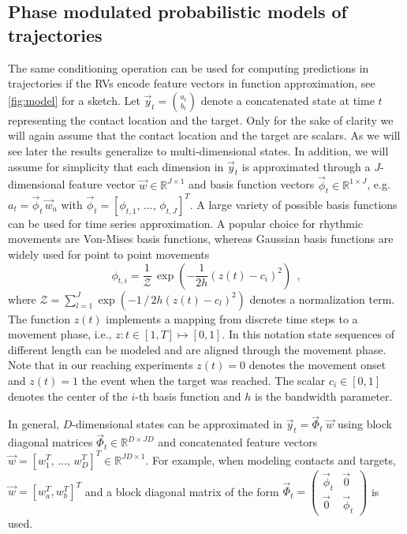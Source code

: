 \subsection*{Phase modulated probabilistic models of trajectories}
The same conditioning operation can be used for computing predictions in trajectories if the RVs 
encode feature vectors in function approximation, see \FigureAbbr \ref{fig:model} for a sketch. 
Let $\vec y_t = {a_t \choose b_t}$ denote a concatenated state at time $t$ representing the contact location and the target. 
Only for the sake of clarity we will again assume that the contact location and the target are 
scalars. As we will see later the results generalize to multi-dimensional states. 
In addition, we will assume for simplicity that each dimension in $\vec y_t$ is 
approximated through a $J$-dimensional feature vector $\vec w \in \mathbb{R}^{J \times 1}$ 
and basis function vectors $\vec \phi_t \in \mathbb{R}^{1 \times J}$, 
e.g.  $a_t = \vec \phi_t \, \vec w_a$ with $\vec \phi_t = \left[\phi_{t,1},\, ..., \, \phi_{t,J}\right]^T$. 
A large variety of possible basis functions can be used for time series approximation. A popular choice 
for rhythmic movements are Von-Mises basis functions, 
whereas Gaussian basis functions are widely used for point to point movements \cite{Rueckert2013, ijspeert2013dynamical} 
\begin{equation*}
 \phi_{t,i} = \frac{1}{\mathcal{Z}} \, \exp \left( -\frac{1}{2 h} \left(z(t) - c_i \right)^2 \right) ~~,
\end{equation*}
where $\mathcal{Z} = \sum_{l=1}^J \exp \left( -1\,/\,2 h \left(z(t) - c_l \right)^2 \right)$ denotes a normalization term.  
The function $z(t)$ implements a mapping from discrete time steps to a movement phase, i.e., $z: t \in [1,T] \mapsto [0,1]$. 
In this notation state sequences of different length can be modeled and are aligned through the movement phase. 
Note that in our reaching experiments $z(t)=0$ denotes the movement onset and $z(t)=1$ the event when the target was reached. 
The scalar $c_i \in [0,1]$ denotes the center of the $i$-th basis function and $h$ is the bandwidth 
parameter. 

In general, $D$-dimensional states can be approximated in $\vec y_t = \vec
\Phi_t \; \vec w$ using block diagonal matrices $\vec \Phi_t \in \mathbb{R}^{D
\times J D}$ and concatenated feature vectors $\vec w = \left[w_1^T,\, ...,\,
w_D^T\right]^T \in \mathbb{R}^{J D \times 1}$. For example, when modeling
contacts and targets,  $\vec w = \left[w_a^T, w_b^T\right]^T$ and a block
diagonal matrix of the form $\vec \Phi_t = \left( \begin{smallmatrix} \vec
\phi_t & \vec 0 \\ \vec 0 & \vec \phi_t \end{smallmatrix} \right)$ is used. 

